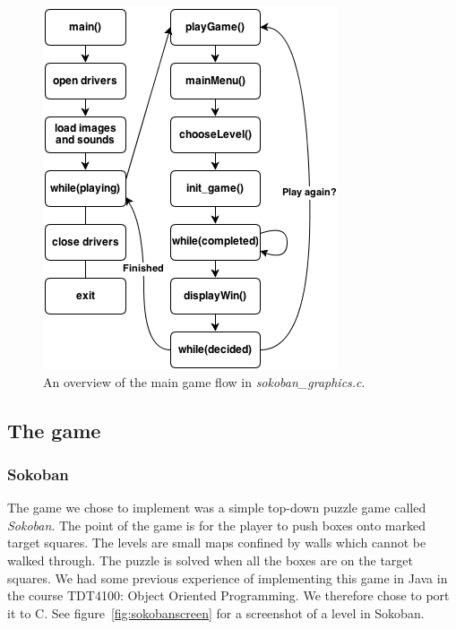 \documentclass[a4paper,11pt]{article}
\begin{document}
\begin{figure}[H]
\centering
\includegraphics[scale=0.6]{images/programflow.png}
\caption{An overview of the main game flow in \textit{sokoban\_graphics.c}.}
\label{fig:programflow}
\end{figure}

\subsection{The game}
\subsubsection{Sokoban}
The game we chose to implement was a simple top-down puzzle game called \textit{Sokoban}\cite{sokoban}. The point of the game is for the player to push boxes onto marked target squares. The levels are small maps confined by walls which cannot be walked through. The puzzle is solved when all the boxes are on the target squares. We had some previous experience of implementing this game in Java in the course TDT4100: Object Oriented Programming. We therefore chose to port it to C. See figure~\ref{fig:sokobanscreen} for a screenshot of a level in Sokoban.
\end{document}
